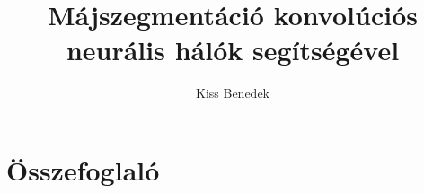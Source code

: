 \documentclass[a4paper]{article}
\title{Májszegmentáció konvolúciós neurális hálók segítségével}
\author{Kiss Benedek}
\begin{document}
	\maketitle
	\section*{Összefoglaló}
	\section*{}
	
\end{document}
